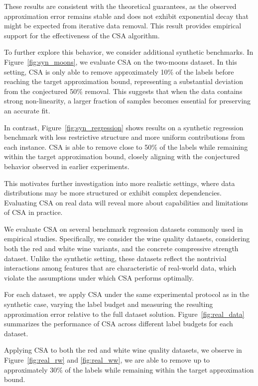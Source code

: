 These results are consistent with the theoretical guarantees, as the observed approximation error remains stable and does not exhibit exponential decay that might be expected from iterative data removal. This result provides empirical support for the effectiveness of the CSA algorithm.

To further explore this behavior, we consider additional synthetic benchmarks. In Figure~\ref{fig:syn_moons}, we evaluate CSA on the two-moons dataset. In this setting, CSA is only able to remove approximately 10\% of the labels before reaching the target approximation bound, representing a substantial deviation from the conjectured 50\% removal. This suggests that when the data contains strong non-linearity, a larger fraction of samples becomes essential for preserving an accurate fit.

In contrast, Figure~\ref{fig:syn_regression} shows results on a synthetic regression benchmark with less restrictive structure and more uniform contributions from each instance. CSA is able to remove close to 50\% of the labels while remaining within the target approximation bound, closely aligning with the conjectured behavior observed in earlier experiments.

This motivates further investigation into more realistic settings, where data distributions may be more structured or exhibit complex dependencies. Evaluating CSA on real data will reveal more about capabilities and limitations of CSA in practice.

We evaluate CSA on several benchmark regression datasets commonly used in empirical studies. Specifically, we consider the wine quality datasets, considering both the red and white wine variants, and the concrete compressive strength dataset. Unlike the synthetic setting, these datasets reflect the nontrivial interactions among features that are characteristic of real-world data, which violate the assumptions under which CSA performs optimally.

For each dataset, we apply CSA under the same experimental protocol as in the synthetic case, varying the label budget and measuring the resulting approximation error relative to the full dataset solution. Figure~\ref{fig:real_data} summarizes the performance of CSA across different label budgets for each dataset.

Applying CSA to both the red and white wine quality datasets, we observe in Figure~\ref{fig:real_rw} and \ref{fig:real_ww}, we are able to remove up to approximately 30\% of the labels while remaining within the target approximation bound. 

